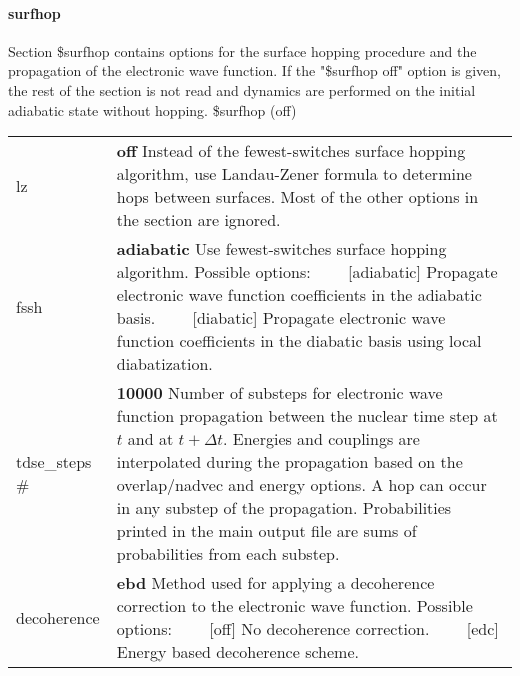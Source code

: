 \documentclass{report}
\newcommand{\tabitem}{~~\llap{--}~~}
\begin{document}
\paragraph{surfhop}
Section \$surfhop contains options for the surface hopping procedure and the propagation of the electronic wave function. If the "\$surfhop off" option is given, the rest of the section is not read and dynamics are performed on the initial adiabatic state without hopping. \newline
\$surfhop (off)


\begin{tabularx}{\textwidth}{ m{2.5cm} X }
lz				&
	\textbf{off}	\newline
	Instead of the fewest-switches surface hopping algorithm, use Landau-Zener formula to determine hops between surfaces. Most of the other options in the section are ignored.\\
	
fssh			&
	\textbf{adiabatic}	\newline
	Use fewest-switches surface hopping algorithm. Possible options: \newline
	\tabitem [adiabatic] Propagate electronic wave function coefficients in the adiabatic basis.
	\tabitem [diabatic] Propagate electronic wave function coefficients in the diabatic basis using local diabatization.\\

tdse\_steps \#	&
	\textbf{10000}	\newline
	Number of substeps for electronic wave function propagation between the nuclear time step at $t$ and at $t + \Delta t$. Energies and couplings are interpolated during the propagation based on the overlap/nadvec and energy options. A hop can occur in any substep of the propagation. Probabilities printed in the main output file are sums of probabilities from each substep. \\

decoherence		&
	\textbf{ebd}	\newline
	Method used for applying a decoherence correction to the electronic wave function. Possible options: \newline				
	\tabitem [off] No decoherence correction. \newline
	\tabitem [edc] Energy based decoherence scheme. \\


\end{tabularx}
\end{document}
